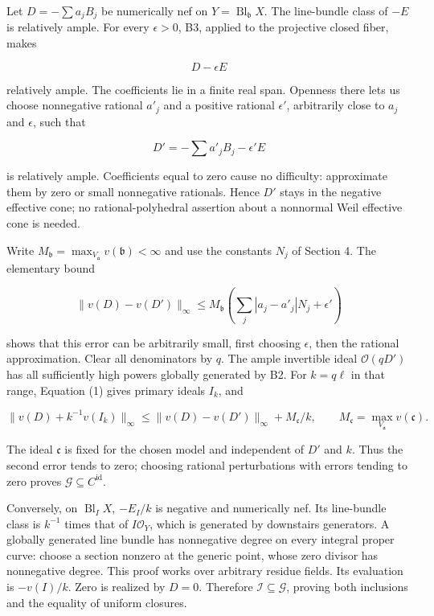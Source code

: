 \documentclass[11pt]{article}
\begin{document}
Let \(D=-\sum a_jB_j\) be numerically nef on \(Y=\operatorname{Bl}_{\mathfrak b}X\). The line-bundle class of \(-E\) is relatively ample. For every \(\epsilon>0\), B3, applied to the projective closed fiber, makes

\[
D-\epsilon E
\]

relatively ample. The coefficients lie in a finite real span. Openness there lets us choose nonnegative rational \(a'_j\) and a positive rational \(\epsilon'\), arbitrarily close to \(a_j\) and \(\epsilon\), such that

\[
D'=-\sum a'_jB_j-\epsilon'E
\]

is relatively ample. Coefficients equal to zero cause no difficulty: approximate them by zero or small nonnegative rationals. Hence \(D'\) stays in the negative effective cone; no rational-polyhedral assertion about a nonnormal Weil effective cone is needed.

Write \(M_{\mathfrak b}=\max_{V_{\mathfrak a}}v(\mathfrak b)<\infty\) and use the constants \(N_j\) of Section 4. The elementary bound

\[
\|v(D)-v(D')\|_\infty
\leq M_{\mathfrak b}\left(\sum_j |a_j-a'_j|N_j+\epsilon'\right)
\]

shows that this error can be arbitrarily small, first choosing \(\epsilon\), then the rational approximation. Clear all denominators by \(q\). The ample invertible ideal \(\mathcal O(qD')\) has all sufficiently high powers globally generated by B2. For \(k=q\ell\) in that range, Equation (1) gives primary ideals \(I_k\), and

\[
\|v(D)+k^{-1}v(I_k)\|_\infty
\leq\|v(D)-v(D')\|_\infty+M_{\mathfrak c}/k,
\qquad M_{\mathfrak c}=\max_{V_{\mathfrak a}}v(\mathfrak c).
\]

The ideal \(\mathfrak c\) is fixed for the chosen model and independent of \(D'\) and \(k\). Thus the second error tends to zero; choosing rational perturbations with errors tending to zero proves \(\mathcal G\subseteq C^{\mathrm{id}}\).

Conversely, on \(\operatorname{Bl}_I X\), \(-E_I/k\) is negative and numerically nef. Its line-bundle class is \(k^{-1}\) times that of \(I\mathcal O_Y\), which is generated by downstairs generators. A globally generated line bundle has nonnegative degree on every integral proper curve: choose a section nonzero at the generic point, whose zero divisor has nonnegative degree. This proof works over arbitrary residue fields. Its evaluation is \(-v(I)/k\). Zero is realized by \(D=0\). Therefore \(\mathcal I\subseteq\mathcal G\), proving both inclusions and the equality of uniform closures.
\end{document}
